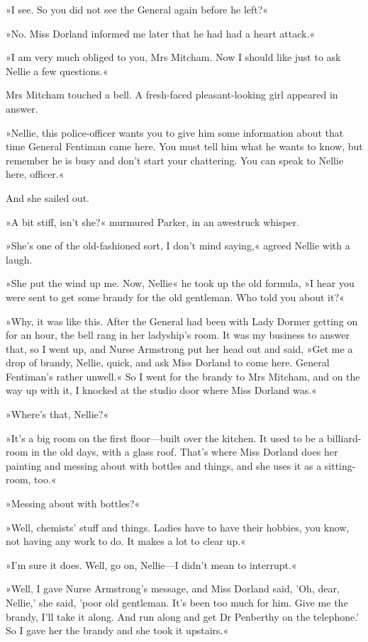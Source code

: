 »I see. So you did not see the General again before he left?«

»No. Miss Dorland informed me later that he had had a heart attack.«

»I am very much obliged to you, Mrs Mitcham. Now I should like just to ask Nellie a few questions.«

Mrs Mitcham touched a bell. A fresh-faced pleasant-looking girl appeared in answer.

»Nellie, this police-officer wants you to give him some information about that time General Fentiman came here. You must tell him what he wants to know, but remember he is busy and don't start your chattering. You can speak to Nellie here, officer.«

And she sailed out.

»A bit stiff, isn't she?« murmured Parker, in an awestruck whisper.

»She's one of the old-fashioned sort, I don't mind saying,« agreed Nellie with a laugh.

»She put the wind up me. Now, Nellie\longdash« he took up the old formula, »I hear you were sent to get some brandy for the old gentleman. Who told you about it?«

»Why, it was like this. After the General had been with Lady Dormer getting on for an hour, the bell rang in her ladyship's room. It was my business to answer that, so I went up, and Nurse Armstrong put her head out and said, »Get me a drop of brandy, Nellie, quick, and ask Miss Dorland to come here. General Fentiman's rather unwell.« So I went for the brandy to Mrs Mitcham, and on the way up with it, I knocked at the studio door where Miss Dorland was.«

»Where's that, Nellie?«

»It's a big room on the first floor\allowbreak---\allowbreak built over the kitchen. It used to be a billiard-room in the old days, with a glass roof. That's where Miss Dorland does her painting and messing about with bottles and things, and she uses it as a sitting-room, too.«

»Messing about with bottles?«

»Well, chemists' stuff and things. Ladies have to have their hobbies, you know, not having any work to do. It makes a lot to clear up.«

»I'm sure it does. Well, go on, Nellie\allowbreak---\allowbreak I didn't mean to interrupt.«

»Well, I gave Nurse Armstrong's message, and Miss Dorland said, 'Oh, dear, Nellie,' she said, 'poor old gentleman. It's been too much for him. Give me the brandy, I'll take it along. And run along and get Dr Penberthy on the telephone.' So I gave her the brandy and she took it upstairs.«

